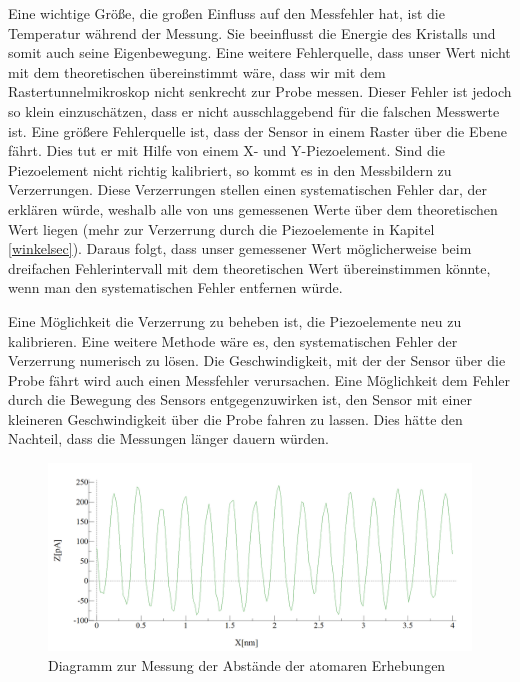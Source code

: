 \documentclass[10pt,a4paper]{article}
\begin{document}
Eine wichtige Größe, die großen Einfluss auf den Messfehler hat, ist die Temperatur während der Messung. Sie beeinflusst die Energie des Kristalls und somit auch seine Eigenbewegung. Eine weitere Fehlerquelle, dass unser Wert nicht mit dem theoretischen übereinstimmt wäre, dass wir mit dem Rastertunnelmikroskop nicht senkrecht zur Probe messen. Dieser Fehler ist jedoch so klein einzuschätzen, dass er nicht ausschlaggebend für die falschen Messwerte ist. Eine größere Fehlerquelle ist, dass der Sensor in einem Raster über die Ebene fährt. Dies tut er mit Hilfe von einem X- und Y-Piezoelement. Sind die Piezoelement nicht richtig kalibriert, so kommt es in den Messbildern zu Verzerrungen. Diese Verzerrungen stellen einen systematischen Fehler dar, der erklären würde, weshalb alle von uns gemessenen Werte über dem theoretischen Wert liegen (mehr zur Verzerrung durch die Piezoelemente in Kapitel \ref{winkelsec}). Daraus folgt, dass unser gemessener Wert möglicherweise beim dreifachen Fehlerintervall mit dem theoretischen Wert übereinstimmen könnte, wenn man den systematischen Fehler entfernen würde.  

Eine Möglichkeit die Verzerrung zu beheben ist, die Piezoelemente neu zu kalibrieren. Eine weitere Methode wäre es, den systematischen Fehler der Verzerrung numerisch zu lösen. Die Geschwindigkeit, mit der der Sensor über die Probe fährt wird auch einen Messfehler verursachen. Eine Möglichkeit dem Fehler durch die Bewegung des Sensors entgegenzuwirken ist, den Sensor mit einer kleineren Geschwindigkeit über die Probe fahren zu lassen. Dies hätte den Nachteil, dass die Messungen länger dauern würden.

\begin{figure}[h]
	\centering
	
	\includegraphics[scale = 0.3]{Aufnahme_Ebene_doppelte_fourier.png}
	
	\caption{Diagramm zur Messung der Abstände der atomaren Erhebungen}
	\label{Messungerh2}
\end{figure}
\end{document}
